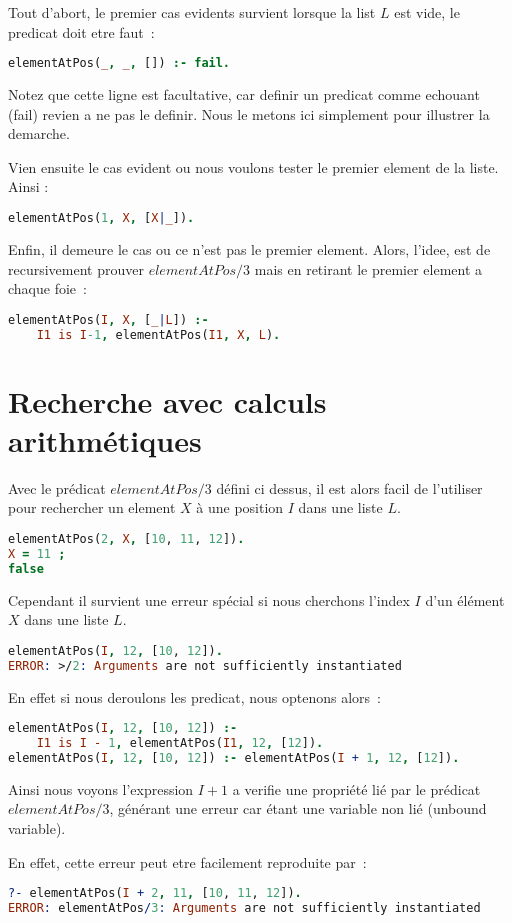 Tout d'abort, le premier cas evidents survient lorsque la list $L$ est vide, le
predicat doit etre faut~:
\begin{lstlisting}[language=Prolog,frame=single]
elementAtPos(_, _, []) :- fail.
\end{lstlisting}
Notez que cette ligne est facultative, car definir un predicat comme echouant
(fail) revien a ne pas le definir. Nous le metons ici simplement pour
illustrer la demarche.

Vien ensuite le cas evident ou nous voulons tester le premier element de la
liste. Ainsi :
\begin{lstlisting}[language=Prolog,frame=single]
elementAtPos(1, X, [X|_]).
\end{lstlisting}

Enfin, il demeure le cas ou ce n'est pas le premier element. Alors, l'idee, est
de recursivement prouver $elementAtPos/3$ mais en retirant le premier element
a chaque foie~:
\begin{lstlisting}[language=Prolog,frame=single]
elementAtPos(I, X, [_|L]) :-
    I1 is I-1, elementAtPos(I1, X, L).
\end{lstlisting}


\section{Recherche avec calculs arithmétiques}

Avec le prédicat $elementAtPos/3$ défini ci dessus, il est alors facil de l'utiliser pour rechercher
un element $X$ à une position $I$ dans une liste $L$.
\begin{lstlisting}[language=Prolog,frame=single]
elementAtPos(2, X, [10, 11, 12]).
X = 11 ;
false
\end{lstlisting}

Cependant il survient une erreur spécial si nous cherchons l'index $I$ d'un élément
$X$ dans une liste $L$.
\begin{lstlisting}[language=Prolog,frame=single]
elementAtPos(I, 12, [10, 12]).
ERROR: >/2: Arguments are not sufficiently instantiated
\end{lstlisting}

En effet si nous deroulons les predicat, nous optenons alors~:
\begin{lstlisting}[language=Prolog,frame=single]
elementAtPos(I, 12, [10, 12]) :-
    I1 is I - 1, elementAtPos(I1, 12, [12]).
elementAtPos(I, 12, [10, 12]) :- elementAtPos(I + 1, 12, [12]).
\end{lstlisting}

Ainsi nous voyons l'expression $I + 1$ a verifie une propriété lié par le prédicat
$elementAtPos/3$, générant une erreur car étant une variable non lié (unbound variable).

En effet, cette erreur peut etre facilement reproduite par~:
\begin{lstlisting}[language=Prolog,frame=single]
?- elementAtPos(I + 2, 11, [10, 11, 12]).
ERROR: elementAtPos/3: Arguments are not sufficiently instantiated
\end{lstlisting}
